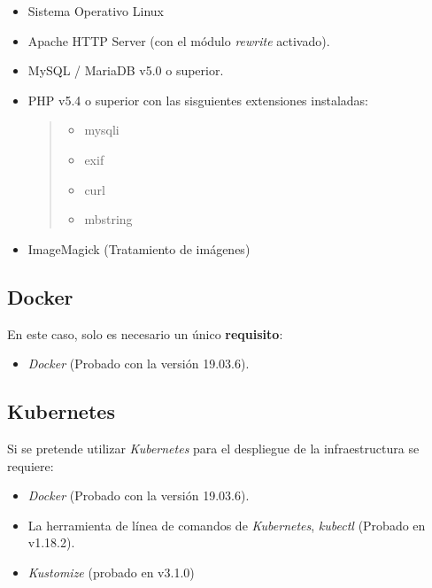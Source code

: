 \begin{itemize}
\tightlist
\item
  Sistema Operativo Linux \cite{linux:web}
\item
  Apache HTTP Server \cite{apache:install} (con el módulo \emph{rewrite} activado).
\item
  MySQL / MariaDB v5.0 \cite{mysql:install} o superior.
\item
  PHP v5.4 \cite{php:install} o superior con las sisguientes extensiones instaladas:
  \begin{quote}
  \begin{itemize}
  \tightlist
  \item
    mysqli
  \item
    exif
  \item
    curl
  \item
    mbstring
  \end{itemize}
  \end{quote}
\item
  ImageMagick \cite{imagemagick:install} (Tratamiento de imágenes)
\end{itemize}

\subsection{Docker}

En este caso, solo es necesario un único \textbf{requisito}:
\begin{itemize}
\tightlist
\item
  \emph{Docker} \cite{docker:install} (Probado con la versión 19.03.6).
\end{itemize}

\subsection{Kubernetes}

Si se pretende utilizar \emph{Kubernetes} para el despliegue de la
infraestructura se requiere:
\begin{itemize}
\tightlist
\item
  \emph{Docker}  \cite{docker:install} (Probado con la versión 19.03.6).
\item
  La herramienta de línea de comandos de \emph{Kubernetes},
  \emph{kubectl} \cite{kubectl:install} (Probado en v1.18.2).
\item
  \emph{Kustomize} \cite{kustomize:repo} (probado en v3.1.0)
\end{itemize}

